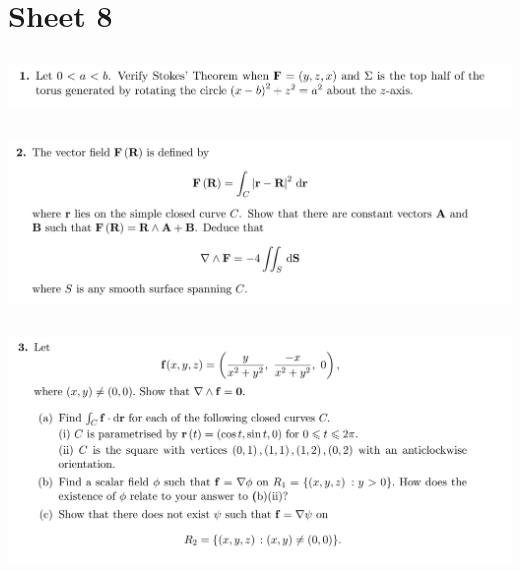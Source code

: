\documentclass[12pt]{article}
\begin{document}
\newpage
\section{Sheet 8}

\subsection{}
\begin{mdframed}
\includegraphics[width=400pt]{img/oxford-prelims-M5-multivariable-calc-8-1.png}
\end{mdframed}

\subsection{}
\begin{mdframed}
\includegraphics[width=400pt]{img/oxford-prelims-M5-multivariable-calc-8-2.png}
\end{mdframed}

\subsection{}
\begin{mdframed}
\includegraphics[width=400pt]{img/oxford-prelims-M5-multivariable-calc-8-3.png}
\end{mdframed}
\end{document}
